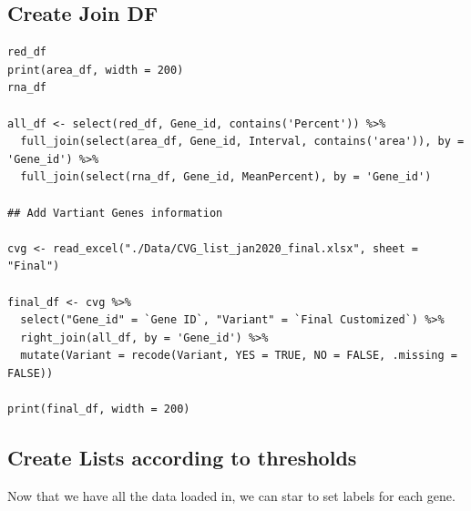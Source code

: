 \documentclass[11pt]{article}
\begin{document}
\subsection{Create Join DF}
\label{sec:orgbd15704}
\begin{verbatim}
red_df
print(area_df, width = 200)
rna_df

all_df <- select(red_df, Gene_id, contains('Percent')) %>%
  full_join(select(area_df, Gene_id, Interval, contains('area')), by = 'Gene_id') %>%
  full_join(select(rna_df, Gene_id, MeanPercent), by = 'Gene_id')

## Add Vartiant Genes information

cvg <- read_excel("./Data/CVG_list_jan2020_final.xlsx", sheet = "Final")

final_df <- cvg %>%
  select("Gene_id" = `Gene ID`, "Variant" = `Final Customized`) %>%
  right_join(all_df, by = 'Gene_id') %>%
  mutate(Variant = recode(Variant, YES = TRUE, NO = FALSE, .missing = FALSE))

print(final_df, width = 200)
\end{verbatim}

\subsection{Create Lists according to thresholds}
\label{sec:orgd7a28e3}

Now that we have all the data loaded in, we can star to set labels for each gene.
\end{document}
